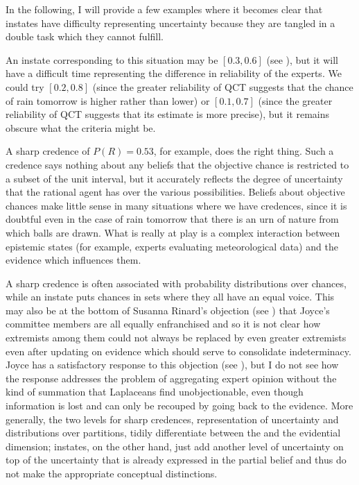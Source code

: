 \documentclass[11pt]{article}
\begin{document}
In the following, I will provide a few examples where it becomes clear
that instates have difficulty representing uncertainty because they
are tangled in a double task which they cannot fulfill.


An instate corresponding to this situation may be $[0.3,0.6]$ (see
), but it will have a difficult time
representing the difference in reliability of the experts. We could
try $[0.2,0.8]$ (since the greater reliability of QCT suggests that
the chance of rain tomorrow is higher rather than lower) or
$[0.1,0.7]$ (since the greater reliability of QCT suggests that its
estimate is more precise), but it remains obscure what the criteria
might be.

A sharp credence of $P(R)=0.53$, for example, does the right thing.
Such a credence says nothing about any beliefs that the objective
chance is restricted to a subset of the unit interval, but it
accurately reflects the degree of uncertainty that the rational agent
has over the various possibilities. Beliefs about objective chances
make little sense in many situations where we have credences, since it
is doubtful even in the case of rain tomorrow that there is an urn of
nature from which balls are drawn. What is really at play is a complex
interaction between epistemic states (for example, experts evaluating
meteorological data) and the evidence which influences them.

A sharp credence is often associated with probability distributions
over chances, while an instate puts chances in sets where they all
have an equal voice. This may also be at the bottom of Susanna
Rinard's objection (see ) that Joyce's
committee members are all equally enfranchised and so it is not clear
how extremists among them could not always be replaced by even greater
extremists even after updating on evidence which should serve to
consolidate indeterminacy. Joyce has a satisfactory response to this
objection (see ), but I do not see how the
response addresses the problem of aggregating expert opinion without
the kind of summation that Laplaceans find unobjectionable, even
though information is lost and can only be recouped by going back to
the evidence. More generally, the two levels for sharp credences,
representation of uncertainty and distributions over partitions,
tidily differentiate between the {\doxnotep} and the evidential
dimension; instates, on the other hand, just add another level of
uncertainty on top of the uncertainty that is already expressed in the
partial belief and thus do not make the appropriate conceptual
distinctions.
\end{document}
